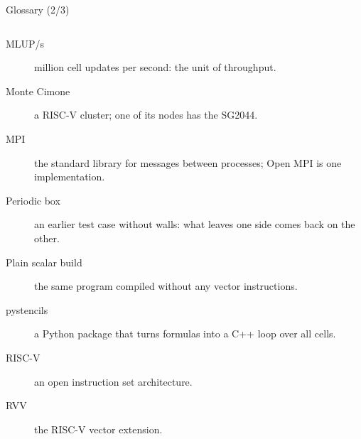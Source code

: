 \documentclass[aspectratio=169,10pt,t]{beamer}
\begin{document}
\begin{frame}{Glossary (2/3)}
\begin{columns}[T,onlytextwidth]
\begin{description}
      \item[MLUP/s] million cell updates per second: the unit of throughput.
      \item[Monte Cimone] a RISC-V cluster; one of its nodes has the SG2044.
      \item[MPI] the standard library for messages between processes; Open MPI is one implementation.
      \item[Periodic box] an earlier test case without walls: what leaves one side comes back on the other.
      \item[Plain scalar build] the same program compiled without any vector instructions.
      \item[pystencils] a Python package that turns formulas into a C++ loop over all cells.
      \item[RISC-V] an open instruction set architecture.
      \item[RVV] the RISC-V vector extension.
    \end{description}
  \end{columns}
\end{frame}
\end{document}
